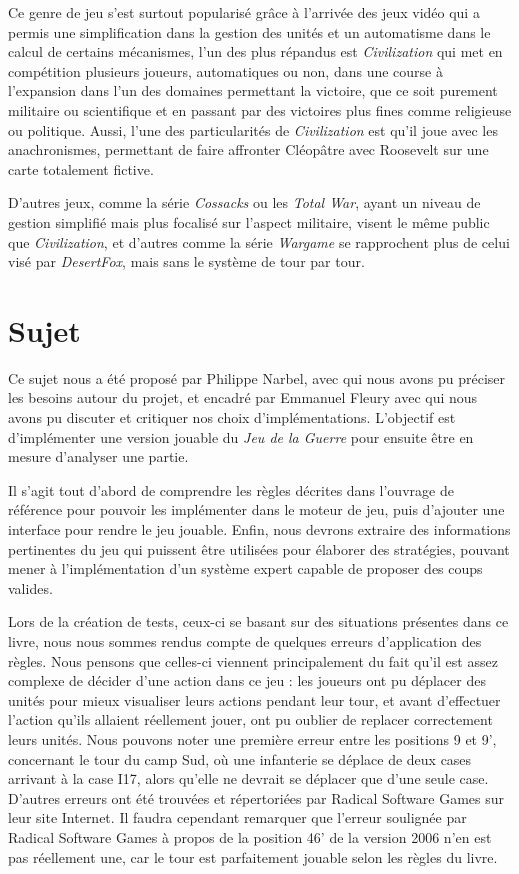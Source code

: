 \documentclass[a4paper]{report}
\begin{document}
Ce genre de jeu s'est surtout popularisé grâce à l'arrivée des jeux vidéo qui a permis une simplification dans la gestion des unités et un automatisme dans le calcul de certains mécanismes, l'un des plus répandus est \textit{Civilization} qui met en compétition plusieurs joueurs, automatiques ou non, dans une course à l'expansion dans l'un des domaines permettant la victoire, que ce soit purement militaire ou scientifique et en passant par des victoires plus fines comme religieuse ou politique. Aussi, l'une des particularités de \textit{Civilization} est qu'il joue avec les anachronismes, permettant  de faire affronter Cléopâtre avec Roosevelt sur une carte totalement fictive. 

D'autres jeux, comme la série \textit{Cossacks} ou les \textit{Total War}, ayant un niveau de gestion simplifié mais plus focalisé sur l'aspect militaire, visent le même public que \textit{Civilization}, et d'autres comme la série \textit{Wargame} se rapprochent plus de celui visé par \textit{DesertFox}, mais sans le système de tour par tour.

\section{Sujet}
\label{sec:Sujet}

Ce sujet nous a été proposé par Philippe Narbel, avec qui nous avons pu préciser les besoins autour du projet, et encadré par Emmanuel Fleury avec qui nous avons pu discuter et critiquer nos choix d'implémentations. L'objectif est d'implémenter une version jouable du \textit{Jeu de la Guerre} pour ensuite être en mesure d'analyser une partie.

Il s'agit tout d'abord de comprendre les règles décrites dans l'ouvrage de référence\cite{jdg} pour pouvoir les implémenter dans le moteur de jeu, puis d'ajouter une interface pour rendre le jeu jouable. Enfin, nous devrons extraire des informations pertinentes du jeu qui puissent être utilisées pour élaborer des stratégies, pouvant mener à l'implémentation d'un système expert capable de proposer des coups valides.

Lors de la création de tests, ceux-ci se basant sur des situations présentes dans ce livre, nous nous sommes rendus compte de quelques erreurs d'application des règles. Nous pensons que celles-ci viennent principalement du fait qu'il est assez complexe de décider d'une action dans ce jeu : les joueurs ont pu déplacer des unités pour mieux visualiser leurs actions pendant leur tour, et avant d'effectuer l'action qu'ils allaient réellement jouer, ont pu oublier de replacer correctement leurs unités. Nous pouvons noter une première erreur entre les positions 9 et 9', concernant le tour du camp Sud, où une infanterie se déplace de deux cases arrivant à la case I17, alors qu'elle ne devrait se déplacer que d'une seule case. D'autres erreurs ont été trouvées et répertoriées par Radical Software Games sur leur site Internet\cite{rsgErrata}. Il faudra cependant remarquer que l'erreur soulignée par Radical Software Games à propos de la position 46' de la version 2006 n'en est pas réellement une, car le tour est parfaitement jouable selon les règles du livre.
\end{document}
